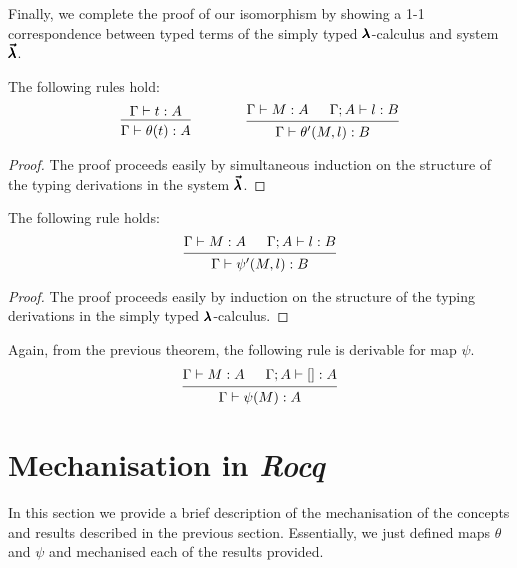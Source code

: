 Finally, we complete the proof of our isomorphism by showing a 1-1 correspondence between typed terms of the simply typed $\pmb{\lambda}$-calculus and system $\pmb{\vec \lambda}$.

\begin{theorem}
  The following rules hold:
  \[ \begin{prooftree}
      \hypo{ \Gamma \vdash t : A }
      \infer1{ \Gamma \vdash \theta(t) : A } 
    \end{prooftree}
    \qquad \qquad
    \begin{prooftree}
      \hypo{ \Gamma \vdash M : A }
      \hypo{ \Gamma ; A \vdash l : B }
      \infer2{ \Gamma \vdash \theta'(M, l) : B }.
    \end{prooftree} \]
\end{theorem}
\begin{proof}
  The proof proceeds easily by simultaneous induction on the structure of the typing derivations in the system $\pmb{\vec \lambda}$.
\end{proof}

\begin{theorem}
  The following rule holds:
  \[ \begin{prooftree}
      \hypo{ \Gamma \vdash M : A }
      \hypo{ \Gamma ; A \vdash l : B }
      \infer2{ \Gamma \vdash \psi'(M, l) : B }.
    \end{prooftree} \]
\end{theorem}
\begin{proof}
  The proof proceeds easily by induction on the structure of the typing derivations in the simply typed $\pmb{\lambda}$-calculus.
\end{proof}

Again, from the previous theorem, the following rule is derivable for map $\psi$.
\[ \begin{prooftree}
    \hypo{ \Gamma \vdash M : A }
    \hypo{ \Gamma ; A \vdash [] : A }
    \infer2{ \Gamma \vdash \psi(M) : A }.
  \end{prooftree} \]


\section{Mechanisation in \textit{Rocq}}

In this section we provide a brief description of the mechanisation of the concepts and results described in the previous section.
Essentially, we just defined maps $\theta$ and $\psi$ and mechanised each of the results provided.

